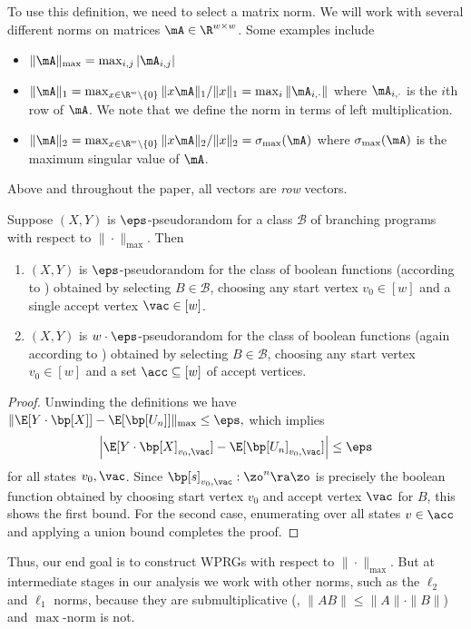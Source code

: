 \documentclass{toc}
\begin{document}
To use this definition, we need to select a matrix norm. We will work with several different norms on matrices $\mA \in \R^{w\times w}$. Some examples include %
\begin{itemize}
    \item $\|\mA\|_{\max} = \max_{i,j}|\mA_{i,j}|$
    \item $\|\mA\|_{1} = \max_{x\in \R^w\setminus\{0\}}\|x\mA\|_1/\|x\|_1 = \max_i \|\mA_{i,\cdot}\|$ where $\mA_{i,\cdot}$ is the $i$th row of $\mA$. We note that we define the norm in terms of left multiplication.
    \item $\|\mA\|_2 = \max_{x\in \R^w\setminus \{0\}} \|x\mA \|_2/\|x\|_2=\sigma_{\max}(\mA)$ where $\sigma_{\max}(\mA)$ is the maximum singular value of $\mA$.
\end{itemize}
Above and throughout the paper, all vectors are \emph{row} vectors.
\begin{lemma}
Suppose $(X,Y)$ is $\eps$-pseudorandom for a class $\mathcal{B}$ of branching programs with respect to $\|\cdot\|_{\max}$. Then
\begin{enumerate}
    \item $(X,Y)$ is $\eps$-pseudorandom for the class of boolean functions (according to ) obtained by selecting $B\in \mathcal{B}$, choosing any start vertex $v_0\in[w]$ and a single accept vertex $\vac\in [w]$.
    \item $(X,Y)$ is $w\cdot \eps$-pseudorandom for the class of boolean functions (again according to ) obtained by selecting $B\in \mathcal{B}$, choosing any start vertex $v_0\in[w]$ and a set $\acc\subseteq[w]$ of accept vertices.
\end{enumerate}
\end{lemma}
\begin{proof}
Unwinding the definitions we have
$\| \E[Y\cdot \bp[X]] - \E[\bp[U_n]]\|_{\max}\leq \eps,$
which implies 
$$\left| \E[Y\cdot \bp[X]_{v_0,\vac}] - \E[\bp[U_n]_{v_0,\vac}]\right|\leq \eps$$
for all states $v_0,\vac$. Since $\bp[s]_{v_0,\vac}:\zo^n\ra \zo$ is precisely the boolean function obtained by choosing start vertex $v_0$ and accept vertex $\vac$ for $B$, this shows the first bound. For the second case, enumerating over all states $v\in \acc$ and applying a union bound completes the proof. 
\end{proof}
Thus, our end goal is to construct WPRGs with respect to $\|\cdot\|_{\max}$. But at intermediate stages in our analysis we work with other norms, such as the $\ell_2$ and $\ell_1$ norms, because they are submultiplicative (\ie, $\|AB\|\leq \|A\|\cdot\|B\|$) and $\max$-norm is not.
\end{document}
